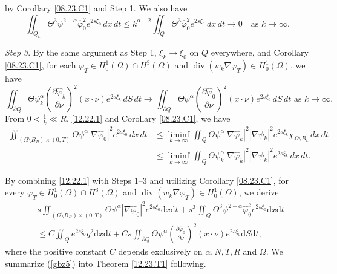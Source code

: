 \documentclass[11pt]{article}
\def\dref#1{(\ref{#1})}
\numberwithin{equation}{section}
\def\dref#1{(\ref{#1})}
\def\pt{\partial}
\def\vp{\varphi}
\def\pt{\partial}
\def\Om{\Omega}
\def\al{\alpha}
\def\f{\frac}
\def\df{\mathrm d}
\def\wh{\widehat}
\DeclareMathOperator{\Div}{div}
\begin{document}
by Corollary \ref{08.23.C1} and Step 1. We also have
\begin{equation*}
\iint_{Q_k}\Theta^3\psi^{2-\alpha}\widehat{\varphi}_0^2e^{2s\xi_0} \, dx \, dt \leq k^{\alpha-2}\iint_{Q}\Theta^3\widehat{\varphi}_0^2e^{2s\xi_0} \, dx \, dt \to 0 \quad \text{as } k \to \infty.
\end{equation*}

{\it Step 3}. By the same argument as Step 1, $\xi_k \to \xi_0$ on $Q$ everywhere, and Corollary \ref{08.23.C1}, for each $\varphi_T \in H_0^1(\Omega) \cap H^3(\Omega)$ and $\Div(w_k \nabla \varphi_T) \in H_0^1(\Omega)$, we have
\begin{equation*}
\iint_{\partial Q}\Theta \psi_k^\alpha\left(\frac{\partial \widehat{\varphi}_k}{\partial\nu}\right)^2 (x \cdot \nu)e^{2s\xi_k} \, dS \, dt \to \iint_{\partial Q}\Theta \psi^\alpha \left(\frac{\partial\widehat{\varphi}_0}{\partial\nu}\right)^2(x \cdot \nu)e^{2s\xi_0} \, dS \, dt \mbox{ as } k \to \infty.
\end{equation*}
From $0 < \frac{1}{k} \ll R$, \eqref{12.22.1} and Corollary \ref{08.23.C1}, we have
\begin{equation*}
\begin{split}
\iint_{(\Omega\setminus B_R) \times (0,T)} \Theta \psi^\alpha |\nabla \widehat{\varphi}_0|^2e^{2s\xi_0} \, dx \, dt
&\leq \liminf_{k \to \infty}\iint_Q \Theta \psi^\alpha |\nabla \widehat{\varphi}_k|^2|\nabla \psi_k|^2e^{2s\xi_k}\chi_{\Omega\setminus B_k} \, dx \, dt\\
&\leq \liminf_{k \to \infty}\iint_Q \Theta \psi_k^\alpha |\nabla \widehat{\varphi}_k|^2|\nabla\psi_k|^2e^{2s\xi_k} \, dx \, dt.
\end{split}
\end{equation*}


   By combining \eqref{12.22.1} with Steps 1–3 and utilizing Corollary \ref{08.23.C1}, for every $\vp_T\in H_0^1(\Om)\cap H^3(\Om)$ and $\Div(w_k \nabla \vp_T)\in H_0^1(\Om)$, we derive
\begin{equation}\label{gbz5}
\begin{split}
&s\iint_{(\Om\setminus B_R)\times (0,T)} \Theta \psi^\al |\nabla \wh\vp_0|^2e^{2s\xi_0}\df x\df t+s^3\iint_Q \Theta^3\psi^{2-\al}\wh\vp_0^2e^{2s\xi_0}\df x\df t\\
&\leq C\iint_Q e^{2s\xi_0}g^2\df x\df t+Cs\iint_{\pt Q}\Theta \psi^{\al}\left(\f{\pt\wh\vp_0}{\pt\nu}\right)^2(x\cdot\nu)e^{2s\xi_0}\df S\df t,
\end{split}
\end{equation}
where the positive constant $C$ depends exclusively on $\al, N, T, R$ and $\Om$. We summarize \dref{gbz5}
into Theorem \ref{12.23.T1} following.
\end{document}
